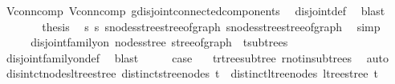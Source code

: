 \begin{isabellebody}
\ V{}{\isacharunderscore}{\kern0pt}conn{\isacharunderscore}{\kern0pt}comp\ V{}{\isacharunderscore}{\kern0pt}conn{\isacharunderscore}{\kern0pt}comp\ g{\isacharprime}{\kern0pt}{\isachardot}{\kern0pt}disjoint{\isacharunderscore}{\kern0pt}connected{\isacharunderscore}{\kern0pt}components\ \isamarkupfalse%
\ disjoint{\isacharunderscore}{\kern0pt}def\ \isamarkupfalse%
\ blast\isanewline
\ \ \ \ \isamarkupfalse%
\ \isamarkupfalse%
\ {\isacharquery}{\kern0pt}thesis\ \isamarkupfalse%
\ s{}\ s{}\ s{}{\isachardot}{\kern0pt}nodes{\isacharunderscore}{\kern0pt}stree{\isacharunderscore}{\kern0pt}stree{\isacharunderscore}{\kern0pt}of{\isacharunderscore}{\kern0pt}graph\ s{}{\isachardot}{\kern0pt}nodes{\isacharunderscore}{\kern0pt}stree{\isacharunderscore}{\kern0pt}stree{\isacharunderscore}{\kern0pt}of{\isacharunderscore}{\kern0pt}graph\ \isamarkupfalse%
\ simp\isanewline
\ \ \isamarkupfalse%
\isanewline
\ \ \isamarkupfalse%
\ \isamarkupfalse%
\ {\isachardoublequoteopen}disjoint{\isacharunderscore}{\kern0pt}family{\isacharunderscore}{\kern0pt}on\ nodes{\isacharunderscore}{\kern0pt}stree\ {\isacharparenleft}{\kern0pt}stree{\isacharunderscore}{\kern0pt}of{\isacharunderscore}{\kern0pt}graph\ {\isacharbackquote}{\kern0pt}\ t{\isachardot}{\kern0pt}subtrees{\isacharparenright}{\kern0pt}{\isachardoublequoteclose}\isanewline
\ \ \ \ \isamarkupfalse%
\ disjoint{\isacharunderscore}{\kern0pt}family{\isacharunderscore}{\kern0pt}on{\isacharunderscore}{\kern0pt}def\ \isamarkupfalse%
\ blast\isanewline
\ \ \isamarkupfalse%
\ \isamarkupfalse%
\ {\isacharquery}{\kern0pt}case\ \isamarkupfalse%
\ {}\ t{\isachardot}{\kern0pt}rtree{\isacharunderscore}{\kern0pt}subtree\ r{\isacharunderscore}{\kern0pt}notin{\isacharunderscore}{\kern0pt}subtrees\ \isamarkupfalse%
\ auto\isanewline
{}\isamarkupfalse%
%
\endisatagproof
{\isafoldproof}%
%
\isadelimproof
\isanewline
%
\endisadelimproof
\isanewline
{}\isamarkupfalse%
\ disintct{\isacharunderscore}{\kern0pt}nodes{\isacharunderscore}{\kern0pt}ltree{\isacharunderscore}{\kern0pt}stree{\isacharcolon}{\kern0pt}\ {\isachardoublequoteopen}distinct{\isacharunderscore}{\kern0pt}stree{\isacharunderscore}{\kern0pt}nodes\ t\ {\isasymLongrightarrow}\ distinct{\isacharunderscore}{\kern0pt}ltree{\isacharunderscore}{\kern0pt}nodes\ {\isacharparenleft}{\kern0pt}ltree{\isacharunderscore}{\kern0pt}stree\ t{\isacharparenright}{\kern0pt}{\isachardoublequoteclose}\isanewline

\end{isabellebody}
